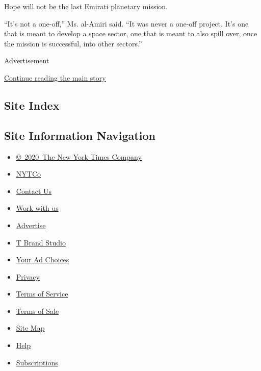 Hope will not be the last Emirati planetary mission.

``It's not a one-off,'' Ms. al-Amiri said. ``It was never a one-off
project. It's one that is meant to develop a space sector, one that is
meant to also spill over, once the mission is successful, into other
sectors.''

Advertisement

\protect\hyperlink{after-bottom}{Continue reading the main story}

\hypertarget{site-index}{%
\subsection{Site Index}\label{site-index}}

\hypertarget{site-information-navigation}{%
\subsection{Site Information
Navigation}\label{site-information-navigation}}

\begin{itemize}
\tightlist
\item
  \href{https://help.nytimes3xbfgragh.onion/hc/en-us/articles/115014792127-Copyright-notice}{©~2020~The
  New York Times Company}
\end{itemize}

\begin{itemize}
\tightlist
\item
  \href{https://www.nytco.com/}{NYTCo}
\item
  \href{https://help.nytimes3xbfgragh.onion/hc/en-us/articles/115015385887-Contact-Us}{Contact
  Us}
\item
  \href{https://www.nytco.com/careers/}{Work with us}
\item
  \href{https://nytmediakit.com/}{Advertise}
\item
  \href{http://www.tbrandstudio.com/}{T Brand Studio}
\item
  \href{https://www.nytimes3xbfgragh.onion/privacy/cookie-policy\#how-do-i-manage-trackers}{Your
  Ad Choices}
\item
  \href{https://www.nytimes3xbfgragh.onion/privacy}{Privacy}
\item
  \href{https://help.nytimes3xbfgragh.onion/hc/en-us/articles/115014893428-Terms-of-service}{Terms
  of Service}
\item
  \href{https://help.nytimes3xbfgragh.onion/hc/en-us/articles/115014893968-Terms-of-sale}{Terms
  of Sale}
\item
  \href{https://spiderbites.nytimes3xbfgragh.onion}{Site Map}
\item
  \href{https://help.nytimes3xbfgragh.onion/hc/en-us}{Help}
\item
  \href{https://www.nytimes3xbfgragh.onion/subscription?campaignId=37WXW}{Subscriptions}
\end{itemize}
